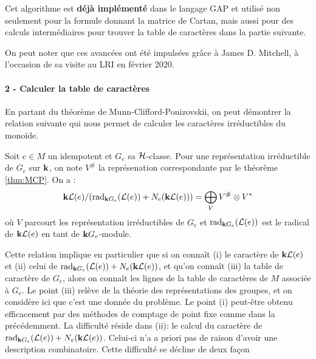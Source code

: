 \documentclass{article}
\begin{document}
	Cet algorithme est \textbf{déjà implémenté} dans le langage GAP et utilisé non seulement pour la formule donnant la matrice de Cartan, mais aussi pour des calculs intermédiaires pour trouver la table de caractères dans la partie suivante. 
	
	On peut noter que ces avancées ont été impulsées grâce à James D. Mitchell, à l'occasion de sa visite au LRI en février 2020.
	
	\paragraph{2 - Calculer la table de caractères}
	
	En partant du théorème de Munn-Clifford-Ponizovskii, on peut démontrer la relation suivante qui nous permet de calculer les caractères irréductibles du monoïde.
	
	\begin{prop}
		Soit $e \in M$ un idempotent et $G_e$ sa $\mathcal{H}$-classe. Pour une représentation irréductible de $G_e$ sur $\mathbf{k}$, on note $V^{\#}$ la représenation correspondante par le théorème \ref{thm:MCP}. On a :
		\[\mathbf{k}\mathcal{L}(e)/(\operatorname{rad}_{\mathbf{k} G_e}(\mathcal{L}(e)) + N_e(\mathbf{k} \mathcal{L}(e))) = \bigoplus_V V^{\#}\otimes V^*\]
		où $V$ parcourt les représentation irréductibles de $G_e$ et $\operatorname{rad}_{\mathbf{k} G_e}(\mathcal{L}(e))$ est le radical de $\mathbf{k} \mathcal{L}(e)$ en tant de $\mathbf{k} G_e$-module.
	\end{prop}
	
	Cette relation implique en particulier que si on connaît (i) le caractère de $\mathbf{k} \mathcal{L}(e)$ et (ii) celui de $\operatorname{rad}_{\mathbf{k} G_e}(\mathcal{L}(e)) + N_e(\mathbf{k} \mathcal{L}(e))$, et qu'on connaît (iii) la table de caractère de $G_e$, alors on connaît les lignes de la table de caractères de $M$ associée à $G_e$.
	Le point (iii) relève de la théorie des représentations des groupes, et on considère ici que c'est une donnée du problème. Le point (i) peut-être obtenu efficacement par des méthodes de comptage de point fixe comme dans la précédemment. La difficulté réside dans (ii): le calcul du caractère de $\operatorname{rad}_{\mathbf{k} G_e}(\mathcal{L}(e)) + N_e(\mathbf{k} \mathcal{L}(e))$. Celui-ci n'a a priori pas de raison d'avoir une description combinatoire. Cette difficulté se décline de deux façon
	
\end{document}
